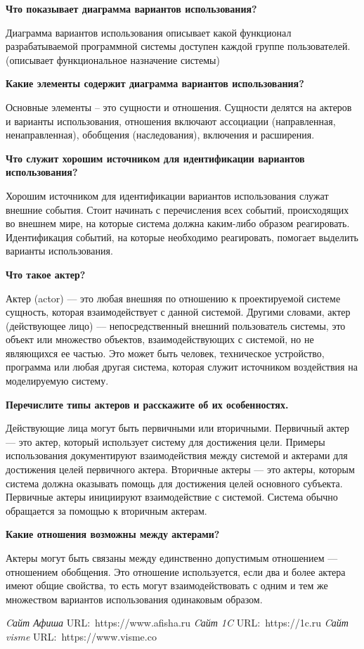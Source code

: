 \textbf{Что показывает диаграмма вариантов использования?}\par
Диаграмма вариантов использования описывает какой функционал разрабатываемой программной системы доступен каждой группе
пользователей. (описывает функциональное назначение системы)\par

\textbf{Какие элементы содержит диаграмма вариантов использования?}\par
Основные элементы – это сущности и отношения.
Сущности делятся на актеров и варианты использования, отношения включают
ассоциации (направленная, ненаправленная), обобщения (наследования), включения и расширения.\par

\textbf{Что служит хорошим источником для идентификации вариантов использования?}\par
Хорошим источником для идентификации вариантов использования служат внешние события.
Стоит начинать с перечисления всех событий, происходящих во внешнем мире, на которые система должна каким-либо образом
реагировать.
Идентификация событий, на которые необходимо реагировать, помогает выделить варианты использования.
\par

\textbf{Что такое актер?}\par
Актер (actor) --- это любая внешняя по отношению к проектируемой системе сущность, которая взаимодействует с данной системой.
Другими словами, актер (действующее лицо) –-- непосредственный внешний пользователь системы, это объект или множество объектов,
взаимодействующих с системой, но не являющихся ее частью.
Это может быть человек, техническое устройство, программа или любая другая система, которая служит источником воздействия
на моделируемую систему.\par

\textbf{Перечислите типы актеров и расскажите об их особенностях.}\par
Действующие лица могут быть первичными или вторичными.
Первичный актер --- это актер, который использует систему для достижения цели.
Примеры использования документируют взаимодействия между системой и актерами для достижения целей первичного актера.
Вторичные актеры --- это актеры, которым система должна оказывать помощь для достижения целей основного субъекта.
Первичные актеры инициируют взаимодействие с системой.
Система обычно обращается за помощью к вторичным актерам.\par

\textbf{Какие отношения возможны между актерами?}\par
Актеры могут быть связаны между единственно допустимым отношением --- отношением обобщения.
Это отношение используется, если два и более актера имеют общие свойства, то есть могут взаимодействовать с одним и тем
же множеством вариантов использования одинаковым образом.\par

\begin{thebibliography}{0}
	 \textit{Cайт Афиша}
	URL:~https://www.afisha.ru
	 \textit{Cайт 1C}
	URL:~https://1c.ru
	 \textit{Cайт visme}
	URL:~https://www.visme.co
\end{thebibliography}